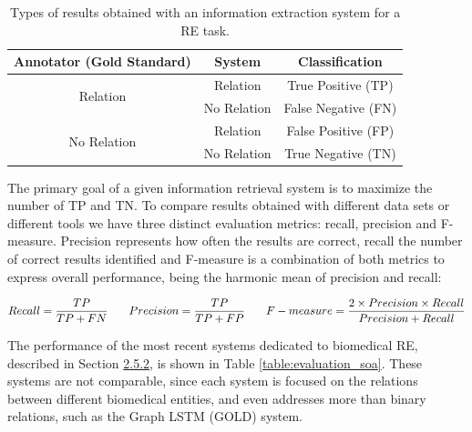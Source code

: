 \begin{table}[!ht]
\renewcommand\arraystretch{1.2}
\small
\captionsetup{font=small}
\caption[Types of Results Obtained with an Information Extraction System for a RE Task]{Types of results obtained with an information extraction system for a RE task.}
\centering
{}
\begin{tabular}{ |c|c|c| }
\hline
\textbf{Annotator (Gold Standard)} & \textbf{System} & \textbf{Classification}\\
\hline\hline
\multirow{2}{*}{Relation} & Relation & True Positive (TP) \\
\cline{2-3}
 & No Relation & False Negative (FN) \\ 
\hline
\multirow{2}{*}{No Relation} & Relation & False Positive (FP) \\
\cline{2-3}
 & No Relation & True Negative (TN) \\
 \hline
\end{tabular}
\label{table:evaluation}
\end{table}

The primary goal of a given information retrieval system is to maximize the number of TP and TN. To compare results obtained with different data sets or different tools we have three distinct evaluation metrics: recall, precision and F-measure. Precision represents how often the results are correct, recall the number of correct results identified and F-measure is a combination of both metrics to express overall performance, being the harmonic mean of precision and recall:

\begin{equation}
\small
Recall = \frac{TP}{TP + FN}
\qquad
Precision = \frac{TP}{TP + FP}
\qquad
F-measure = \frac{2\times Precision\times Recall}{Precision + Recall}
\label{equation:evaluation}
\end{equation}

The performance of the most recent systems dedicated to biomedical RE, described in Section \hyperlink{2.5.2}{2.5.2}, is shown in Table \ref{table:evaluation_soa}. These systems are not comparable, since each system is focused on the relations between different biomedical entities, and even addresses more than binary relations, such as the Graph LSTM (GOLD) system. 

